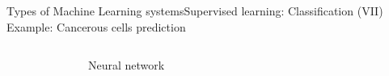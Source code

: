 \documentclass[10pt,compress]{beamer} %
\begin{document}
\begin{frame}[fragile]{Types of Machine Learning systems}{Supervised learning: Classification (VII)}
	Example: Cancerous cells prediction
	\begin{columns}
			\begin{figure}
			\centering{
			\resizebox{0.9\textwidth}{!}{}}
			\end{figure}

	   		\begin{exampleblock}{Neural network}
				\begin{figure}
				\centering{
				\resizebox{0.9\textwidth}{!}{}}
				\end{figure}
	   		\end{exampleblock}
	\end{columns}
\end{frame}
\end{document}
